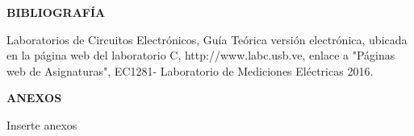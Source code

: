 \documentclass[12pt]{article}
\begin{document}
    \begin{center}
        \textbf{\large BIBLIOGRAFÍA}\\
    \end{center}
    
    \noindent Laboratorios de Circuitos Electrónicos, Guía Teórica versión electrónica, ubicada en la página web del laboratorio C, http://www.labc.usb.ve, enlace a "Páginas web de Asignaturas", EC1281- Laboratorio de Mediciones Eléctricas 2016.
    
    \newpage
    
    \begin{center}
        \textbf{\large ANEXOS}\\
    \end{center}
    
    Inserte anexos
	
\end{document}
